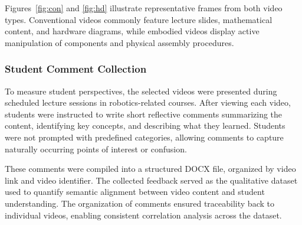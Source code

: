 Figures~\ref{fig:con} and \ref{fig:hd} illustrate representative frames from both video types. Conventional videos commonly feature lecture slides, mathematical content, and hardware diagrams, while embodied videos display active manipulation of components and physical assembly procedures.

\subsubsection{Student Comment Collection}

To measure student perspectives, the selected videos were presented during scheduled lecture sessions in robotics-related courses. After viewing each video, students were instructed to write short reflective comments summarizing the content, identifying key concepts, and describing what they learned. Students were not prompted with predefined categories, allowing comments to capture naturally occurring points of interest or confusion.

These comments were compiled into a structured DOCX file, organized by video link and video identifier. The collected feedback served as the qualitative dataset used to quantify semantic alignment between video content and student understanding. The organization of comments ensured traceability back to individual videos, enabling consistent correlation analysis across the dataset.

